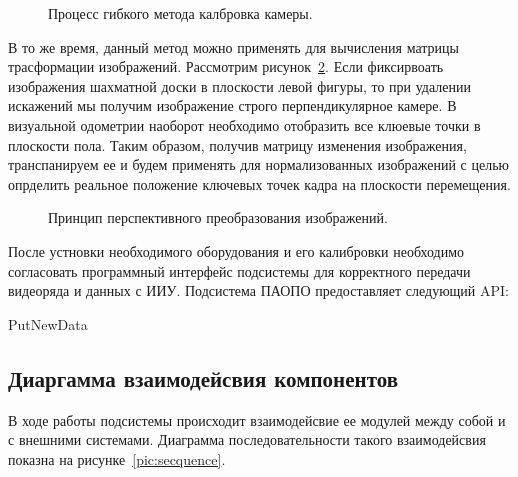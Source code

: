 \begin{figure}[!h]
\caption{Процесс гибкого метода калбровка камеры.}
\label{pic:calibrationMan}
\end{figure}

В то же время, данный метод можно применять для вычисления матрицы трасформации изображений. Рассмотрим рисунок~\ref{pic:perspectiveTranform}. Если фиксирвоать изображения шахматной доски в плоскости левой фигуры, то при удалении искажений мы получим изображение строго перпендикулярное камере. В визуальной одометрии наоборот необходимо отобразить все клюевые точки в плоскости пола. Таким образом, получив матрицу изменения изображения, транспанируем ее и будем применять для нормализованных изображений с целью опрделить реальное положение ключевых точек кадра на плоскости перемещения. 

\begin{figure}[!h]
\caption{Принцип перспективного преобразования изображений.}
\label{pic:perspectiveTranform}
\end{figure}

После устновки необходимого оборудования и его калибровки необходимо согласовать программный интерфейс подсистемы для корректного передачи видеоряда и данных с ИИУ. 
Подсистема ПАОПО предоставляет следующий API:

PutNewData


\subsection{Диаргамма взаимодейсвия компонентов}
В ходе работы подсистемы происходит взаимодейсвие ее модулей между собой и с внешними системами. Диаграмма последовательности такого взаимодейсвия показна на рисунке~\ref{pic:secquence}.

